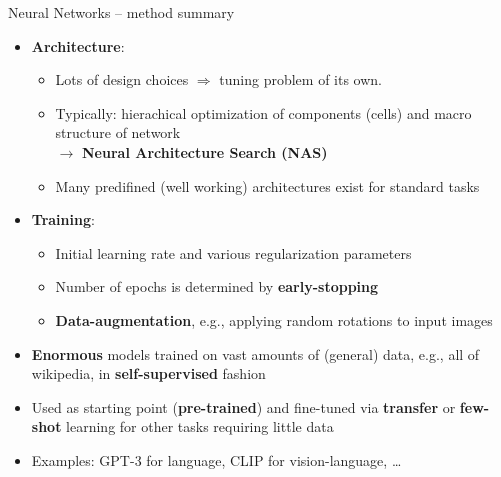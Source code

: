 
\begin{frame}{Neural Networks -- method summary}

\footnotesize



\begin{itemize}
  \item \textbf{Architecture}:
  \begin{itemize}
    \item Lots of design choices $\Rightarrow$ tuning problem of its own.
    \item Typically: hierachical optimization of components (cells) and macro structure of network\\ 
    $\rightarrow$ \textbf{Neural Architecture Search (NAS)}
    \item Many predifined (well working) architectures exist for standard tasks
  \end{itemize}
  \item \textbf{Training}:
  \begin{itemize}
    \item Initial learning rate and various regularization parameters
    \item Number of epochs is determined by \textbf{early-stopping}
    \item \textbf{Data-augmentation}, e.g., applying random rotations to input images
  \end{itemize}
\end{itemize}

\medskip


\begin{itemize}
    \item \textbf{Enormous} models trained on vast amounts of (general) data, e.g., all of wikipedia, in \textbf{self-supervised} fashion
    \item Used as starting point (\textbf{pre-trained}) and fine-tuned via \textbf{transfer} or \textbf{few-shot} learning for other tasks requiring little data
    \item Examples: GPT-3 for language, CLIP for vision-language, \dots
\end{itemize}


\end{frame}
